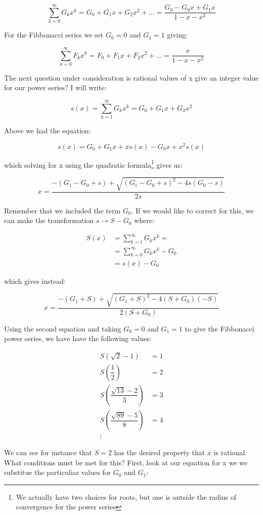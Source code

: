 \documentclass[12pt]{article}
\begin{document}
$$
\sum_{k=0}^\infty G_k x^k = G_0 + G_1 x + G_2 x^2 + \dots =  \dfrac{G_0 - G_0 x + G_1 x}{1 - x - x^2}
$$

For the Fibbonacci series we set $G_0 = 0$ and $G_1 = 1$ giving:

$$
\sum_{k=0}^\infty F_k x^k = F_0 + F_1 x + F_2 x^2 + \dots =  \dfrac{x}{1 - x - x^2}
$$


\newpage

The next question under consideration is rational values of x give an integer value for our power series? I will write:

$$
s(x) = \sum_{k=1}^\infty G_k x^k = G_0 + G_1 x + G_2 x^2
$$

Above we had the equation:

$$
s(x) =  G_0 + G_1 x + xs(x) - G_0 x + x^2 s(x)
$$ 

which solving for x using the quadratic formula\footnote{We actually have two choices for roots, but one is outside the radius of convergence for the power series} gives us:

$$
x = \dfrac{-(G_1 - G_0 + s) + \sqrt{(G_1 - G_0 + s)^2 - 4s(G_0-s)}}{2s}
$$

Remember that we included the term $G_0$. If we would like to correct for this, we can make the transformation $s \rightarrow S - G_0$ where:

\begin{align*}
S(x)&= \sum_{k=1}^\infty G_k x^k = \\
       &= \sum_{k=0}^\infty G_k x^k - G_0\\
       &= s(x) - G_0
\end{align*}

which gives instead:

$$
x = \dfrac{-(G_1 + S) + \sqrt{(G_1 + S)^2 - 4(S + G_0)(-S)}}{2(S + G_0)}
$$

\newpage

Using the second equation and taking $G_0 = 0$ and $G_1 = 1$ to give the Fibbonacci power series, we have have the following values:

\begin{align*}
S\left(\sqrt{2} -1\right) &= 1\\
S\left(\dfrac{1}{2}\right) &= 2\\
S\left(\dfrac{\sqrt{13} - 2}{3}\right) &= 3\\
S\left(\dfrac{\sqrt{89} - 5}{8}\right) &= 4\\
\vdots
\end{align*}

We can see for instance that $S = 2$ has the desired property that $x$ is rational. What conditions must be met for this? First, look at our equation for x we we substitue the particuliar values for $G_0$ and $G_1$:
\end{document}

